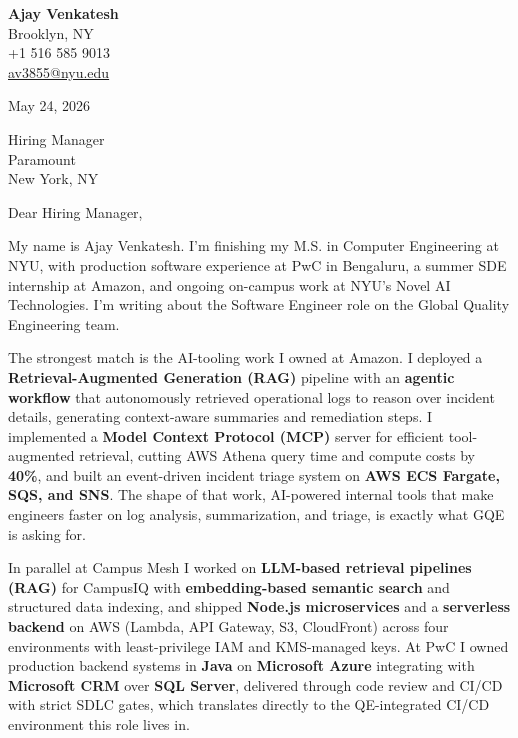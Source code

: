 \documentclass[letterpaper,11pt]{article}
\begin{document}
\begin{flushleft}
\textbf{\large Ajay Venkatesh} \\
Brooklyn, NY \\
+1 516 585 9013 \\
\href{mailto:av3855@nyu.edu}{av3855@nyu.edu}
\end{flushleft}
\vspace{10pt}
May 24, 2026
\vspace{6pt}

Hiring Manager \\
Paramount \\
New York, NY

\vspace{10pt}

Dear Hiring Manager,

My name is Ajay Venkatesh. I'm finishing my M.S. in Computer Engineering at NYU, with production software experience at PwC in Bengaluru, a summer SDE internship at Amazon, and ongoing on-campus work at NYU's Novel AI Technologies. I'm writing about the Software Engineer role on the Global Quality Engineering team.

The strongest match is the AI-tooling work I owned at Amazon. I deployed a \textbf{Retrieval-Augmented Generation (RAG)} pipeline with an \textbf{agentic workflow} that autonomously retrieved operational logs to reason over incident details, generating context-aware summaries and remediation steps. I implemented a \textbf{Model Context Protocol (MCP)} server for efficient tool-augmented retrieval, cutting AWS Athena query time and compute costs by \textbf{40\%}, and built an event-driven incident triage system on \textbf{AWS ECS Fargate, SQS, and SNS}. The shape of that work, AI-powered internal tools that make engineers faster on log analysis, summarization, and triage, is exactly what GQE is asking for.

In parallel at Campus Mesh I worked on \textbf{LLM-based retrieval pipelines (RAG)} for CampusIQ with \textbf{embedding-based semantic search} and structured data indexing, and shipped \textbf{Node.js microservices} and a \textbf{serverless backend} on AWS (Lambda, API Gateway, S3, CloudFront) across four environments with least-privilege IAM and KMS-managed keys. At PwC I owned production backend systems in \textbf{Java} on \textbf{Microsoft Azure} integrating with \textbf{Microsoft CRM} over \textbf{SQL Server}, delivered through code review and CI/CD with strict SDLC gates, which translates directly to the QE-integrated CI/CD environment this role lives in.
\end{document}
